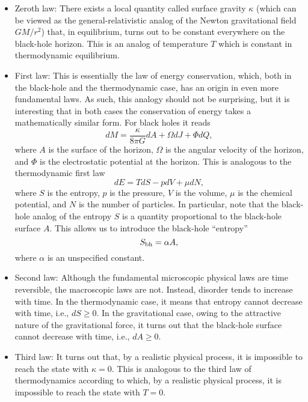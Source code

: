 \documentclass[12pt]{article}
\begin{document}
\begin{itemize}
\item
Zeroth law: There exists a local quantity called surface gravity 
$\kappa$ (which can be viewed as the general-relativistic analog 
of the Newton gravitational field $GM/r^2$)
that, in equilibrium, turns out to be constant everywhere    
on the black-hole horizon. This is an analog of temperature $T$ 
which is constant in thermodynamic equilibrium.
\item
First law: This is essentially the law of energy conservation, 
which, both in the black-hole and the thermodynamic case, has an 
origin in even more fundamental laws. As such, this analogy 
should not be surprising, but it is interesting that in both cases
the conservation of energy takes a mathematically similar form. 
For black holes it reads
\begin{equation}\label{dM}
dM=\frac{\kappa}{8\pi G}dA +\Omega dJ +\Phi dQ,
\end{equation}
where $A$ is the surface 
of the horizon, $\Omega$ is the angular velocity 
of the horizon, and $\Phi$ is the electrostatic potential
at the horizon. This is analogous to the thermodynamic first law
\begin{equation}\label{dE}
dE=TdS-pdV+\mu dN ,
\end{equation}
where $S$ is the entropy, $p$ is the pressure, $V$ is the volume,
$\mu$ is the chemical potential, and $N$ is the number of particles.
In particular, note that the black-hole analog of the entropy $S$
is a quantity proportional to the black-hole surface $A$.
This allows us to introduce the black-hole ``entropy''
\begin{equation}\label{S=A}
S_{\rm bh}=\alpha A ,
\end{equation}
where $\alpha$ is an unspecified constant.  
\item
Second law: Although the fundamental microscopic physical 
laws are time reversible, the macroscopic laws are not.
Instead, disorder tends to increase with time. In the 
thermodynamic case, it means that entropy cannot decrease with 
time, i.e., $dS\geq 0$. In the gravitational case, owing 
to the attractive nature of the gravitational force, it turns out 
that the black-hole surface cannot decrease with time, i.e., 
$dA\geq 0$.
\item
Third law: It turns out that, by a realistic 
physical process, it is impossible to reach the state with 
$\kappa=0$. This is analogous to the third law of thermodynamics 
according to which, by a realistic physical process, 
it is impossible to reach the state with $T=0$. 
\end{itemize}
\end{document}
